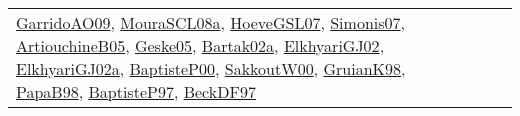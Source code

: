 {\begin{longtable}{lp{3cm}>{\raggedright}p{6cm}>{\raggedright}p{6cm}p{8cm}}
\href{articles/GarridoAO09.pdf}{GarridoAO09}\cite{GarridoAO09}, \href{papers/MouraSCL08a.pdf}{MouraSCL08a}\cite{MouraSCL08a}, \href{papers/HoeveGSL07.pdf}{HoeveGSL07}\cite{HoeveGSL07}, \href{articles/Simonis07.pdf}{Simonis07}\cite{Simonis07}, \href{papers/ArtiouchineB05.pdf}{ArtiouchineB05}\cite{ArtiouchineB05}, \href{papers/Geske05.pdf}{Geske05}\cite{Geske05}, \href{papers/Bartak02a.pdf}{Bartak02a}\cite{Bartak02a}, \href{papers/ElkhyariGJ02.pdf}{ElkhyariGJ02}\cite{ElkhyariGJ02}, \href{papers/ElkhyariGJ02a.pdf}{ElkhyariGJ02a}\cite{ElkhyariGJ02a}, \href{articles/BaptisteP00.pdf}{BaptisteP00}\cite{BaptisteP00}, \href{articles/SakkoutW00.pdf}{SakkoutW00}\cite{SakkoutW00}, \href{papers/GruianK98.pdf}{GruianK98}\cite{GruianK98}, \href{articles/PapaB98.pdf}{PapaB98}\cite{PapaB98}, \href{papers/BaptisteP97.pdf}{BaptisteP97}\cite{BaptisteP97}, \href{papers/BeckDF97.pdf}{BeckDF97}\cite{BeckDF97}\\

\end{longtable}}
